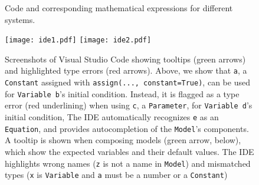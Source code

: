 \documentclass[namedate,numsec,webpdf,modern,large]{oup-authoring-template}
\theoremstyle{thmstyleone}%
\theoremstyle{thmstyletwo}%
\theoremstyle{thmstylethree}%
\begin{document}
\begin{figure}[t]
\begin{minipage}[t]{\columnwidth}
  \end{minipage}%
  
  \caption{
    \label{fig-poincare}
    Code and corresponding mathematical expressions for different systems.
  }
  
\end{figure}

\begin{figure}[t]
  \texttt{[image: ide1.pdf]}
  \texttt{[image: ide2.pdf]}
  \caption{
    \label{fig-ide}
    Screenshots of Visual Studio Code showing
    tooltips (green arrows) and
    highlighted type errors (red arrows).
    Above,
    we show that \texttt{a},
    a \texttt{Constant} assigned with \texttt{assign(...,\ constant=True)},
    can be used for \texttt{Variable b}'s initial condition.
    Instead,
    it is flagged as a type error (red underlining)
    when using \texttt{c}, a \texttt{Parameter},
    for \texttt{Variable d}'s initial condition,
    The IDE automatically recognizes \texttt{e} as an \texttt{Equation},
    and provides autocompletion of the \texttt{Model}'s components.
    A tooltip is shown when composing models (green arrow, below),
    which show the expected variables and their default values.
    The IDE highlights wrong names (\texttt{z} is not a name in \texttt{Model})
    and mismatched types (\texttt{x} is \texttt{Variable} and \texttt{a} must be a number or a \texttt{Constant})
  }  
\end{figure}
\end{document}
